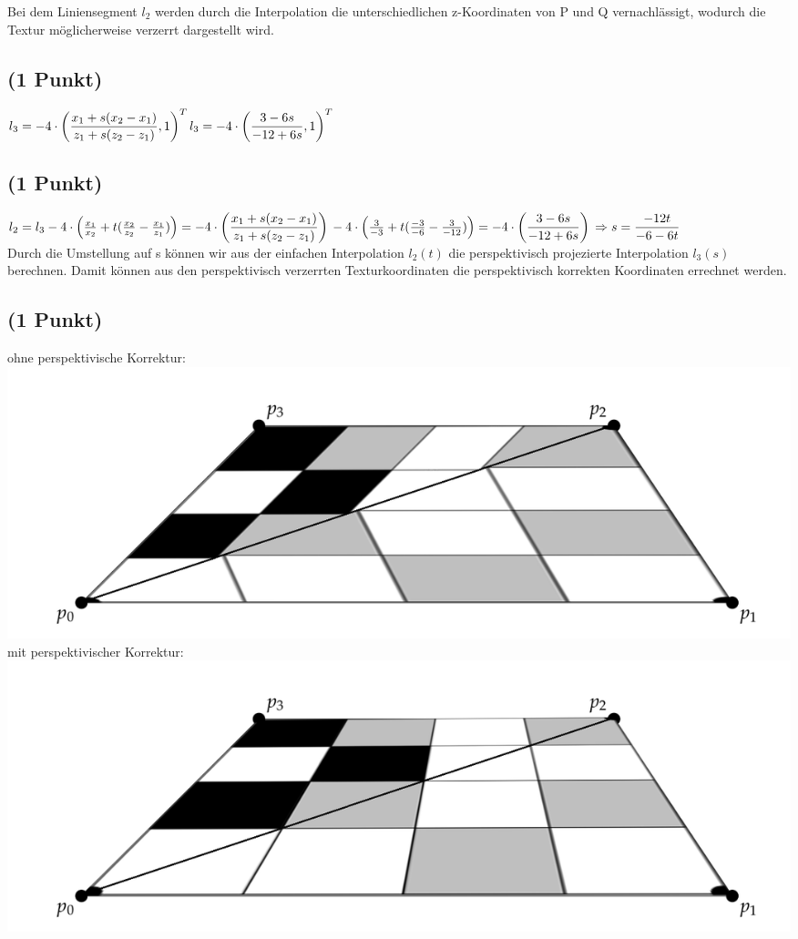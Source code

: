 \documentclass[a4paper,10pt,DIV=14]{article}
\begin{document}
Bei dem Liniensegment $l_2$ werden durch die Interpolation die unterschiedlichen z-Koordinaten von P und Q vernachlässigt, wodurch die Textur möglicherweise verzerrt dargestellt wird.
\subsection{(1 Punkt)} 

$
l_3 = -4 \cdot \left( \dfrac{x_1 + s (x_2 - x_1)}{z_1 + s(z_2 - z_1)}, 1\right)^T\\
l_3 = -4 \cdot \left( \dfrac{3 - 6s}{-12 + 6s}, 1\right)^T
$

\subsection{(1 Punkt)}

$
l_2 = l_3\\
-4 \cdot \left( \frac{x_1}{x_2} + t(\frac{x_2}{z_2} - \frac{x_1}{z_1}) \right) = -4 \cdot \left( \dfrac{x_1 + s (x_2 - x_1)}{z_1 + s (z_2 - z_1)}\right)\\
-4 \cdot \left( \frac{3}{-3} + t(\frac{-3}{-6} - \frac{3}{-12}) \right) = -4 \cdot \left( \dfrac{3 - 6s }{-12 + 6s}\right)\\
\Rightarrow s = \dfrac{-12t}{-6 -6t}
$\\

Durch die Umstellung auf s können wir aus der einfachen Interpolation $l_2(t)$ die perspektivisch projezierte Interpolation $l_3(s)$ berechnen. Damit können aus den perspektivisch verzerrten Texturkoordinaten die perspektivisch korrekten Koordinaten errechnet werden. 

\subsection{(1 Punkt)}

ohne perspektivische Korrektur:\\
\includegraphics[scale = .2]{3d_2}\\

mit perspektivischer Korrektur: \\
\includegraphics[scale= .2]{3d_1}
\end{document}

